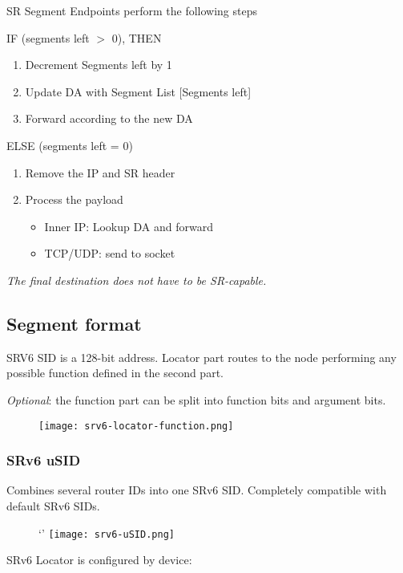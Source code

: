 \vspace{5mm}
\noindent
SR Segment Endpoints perform the following steps

\noindent
IF (segments left $>$ 0), THEN 
\begin{enumerate}
    \item Decrement Segments left by 1
    \item Update DA with Segment List [Segments left]
    \item Forward according to the new DA
\end{enumerate}

\noindent
ELSE (segments left = 0)
\begin{enumerate}
    \item Remove the IP and SR header
    \item Process the payload
    \begin{itemize}
        \item Inner IP: Lookup DA and forward
        \item TCP/UDP: send to socket
    \end{itemize}
\end{enumerate}

\emph{The final destination does not have to be SR-capable.}

\subsection{Segment format}
SRV6 SID is a 128-bit address.
Locator part routes to the node performing any possible function defined in the second part.

\emph{Optional}: the function part can be split into function bits and argument bits.
\begin{figure}[h]
    \centering
    \texttt{[image: srv6-locator-function.png]}
\end{figure}

\subsubsection{SRv6 uSID}
Combines several router IDs into one SRv6 SID. Completely compatible with default SRv6 SIDs.

\begin{figure}`'
    \centering
    \texttt{[image: srv6-uSID.png]}
\end{figure}

\vspace{5mm}
\noindent
SRv6 Locator is configured by device:

